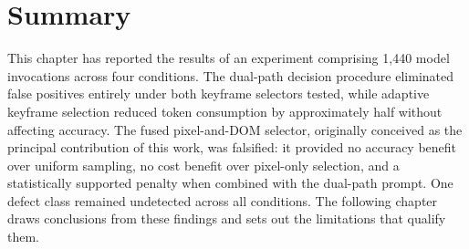 \section{Summary}
\label{sec:r-summary}

This chapter has reported the results of an experiment comprising 1{,}440
model invocations across four conditions. The dual-path decision procedure
eliminated false positives entirely under both keyframe selectors tested,
while adaptive keyframe selection reduced token consumption by
approximately half without affecting accuracy. The fused pixel-and-DOM
selector, originally conceived as the principal contribution of this work,
was falsified: it provided no accuracy benefit over uniform sampling, no
cost benefit over pixel-only selection, and a statistically supported
penalty when combined with the dual-path prompt. One defect class remained
undetected across all conditions. The following chapter draws conclusions
from these findings and sets out the limitations that qualify them.